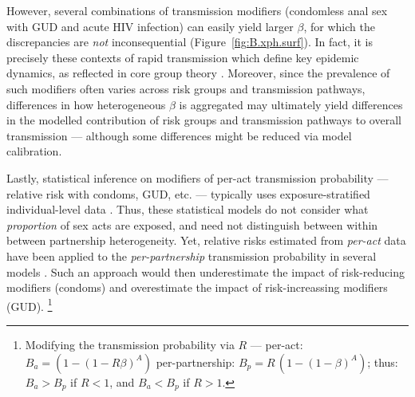 However, several combinations of transmission modifiers
(\eg condomless anal sex with GUD and acute HIV infection) \cite{Boily2009,Fox2011}
can easily yield larger $\beta$, for which the discrepancies are \emph{not} inconsequential
(\eg Figure~\ref{fig:B.xph.surf}).
In fact, it is precisely these contexts of rapid transmission which define key epidemic dynamics,
as reflected in core group theory \cite{Watts2010}.
Moreover, since the prevalence of such modifiers
often varies across risk groups and transmission pathways,
differences in how heterogeneous $\beta$ is aggregated may ultimately yield
differences in the modelled contribution of risk groups and transmission pathways
to overall transmission --- although some differences might be reduced via model calibration.
\par
Lastly, statistical inference on modifiers of per-act transmission probability
--- \eg relative risk with condoms, GUD, etc. --- typically uses
exposure-stratified individual-level data \cite{Jewell1990,Gray2001,Wawer2005,Boily2009}.
Thus, these statistical models do not consider what \emph{proportion} of sex acts are exposed,
and need not distinguish between within \vs between partnership heterogeneity.
Yet, relative risks estimated from \emph{per-act} data
have been applied to the \emph{per-partnership} transmission probability in several models
\cite{TOOD}. %
Such an approach would then
underestimate the impact of risk-reducing modifiers (\eg condoms) and
overestimate the impact of risk-increassing modifiers (\eg GUD).%
\footnote{Modifying the transmission probability via $R$ ---
  per-act: $B_a = (1 - {(1 - R\beta)}^A)$ \vs per-partnership: $B_p = R\,(1 - {(1 - \beta)}^A)$;
  thus: $B_a > B_p$ if $R < 1$, and $B_a < B_p$ if $R > 1$.}
